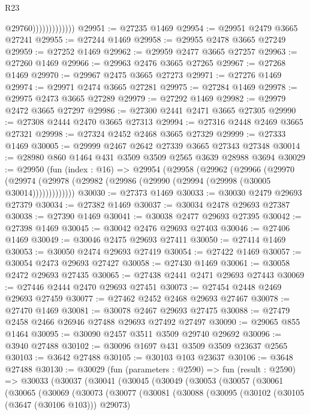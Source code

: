 \begin{lexlean}{R23}
\begin{coremodule}
                              @29760)))))))))))))
@29951 := @27235 @1469
@29954 := @29951 @2479 @3665 @27241
@29955 := @27244 @1469
@29958 := @29955 @2478 @3665 @27249
@29959 := @27252 @1469
@29962 := @29959 @2477 @3665 @27257
@29963 := @27260 @1469
@29966 := @29963 @2476 @3665 @27265
@29967 := @27268 @1469
@29970 := @29967 @2475 @3665 @27273
@29971 := @27276 @1469
@29974 := @29971 @2474 @3665 @27281
@29975 := @27284 @1469
@29978 := @29975 @2473 @3665 @27289
@29979 := @27292 @1469
@29982 := @29979 @2472 @3665 @27297
@29986 := @27300 @2441 @2471 @3665 @27305
@29990 := @27308 @2444 @2470 @3665 @27313
@29994 := @27316 @2448 @2469 @3665 @27321
@29998 := @27324 @2452 @2468 @3665 @27329
@29999 := @27333 @1469
@30005 := @29999 @2467 @2642 @27339 @3665 @27343 @27348
@30014 := @28980 @860 @1464 @431 @3509 @3509 @2565 @3639 @28988 @3694
@30029 := @29950
    (fun (index : @16) =>
    @29954
      (@29958
        (@29962
          (@29966
            (@29970
              (@29974 (@29978 (@29982 (@29986 (@29990 (@29994 (@29998 (@30005 @30014)))))))))))))
@30030 := @27373 @1469
@30033 := @30030 @2479 @29693 @27379
@30034 := @27382 @1469
@30037 := @30034 @2478 @29693 @27387
@30038 := @27390 @1469
@30041 := @30038 @2477 @29693 @27395
@30042 := @27398 @1469
@30045 := @30042 @2476 @29693 @27403
@30046 := @27406 @1469
@30049 := @30046 @2475 @29693 @27411
@30050 := @27414 @1469
@30053 := @30050 @2474 @29693 @27419
@30054 := @27422 @1469
@30057 := @30054 @2473 @29693 @27427
@30058 := @27430 @1469
@30061 := @30058 @2472 @29693 @27435
@30065 := @27438 @2441 @2471 @29693 @27443
@30069 := @27446 @2444 @2470 @29693 @27451
@30073 := @27454 @2448 @2469 @29693 @27459
@30077 := @27462 @2452 @2468 @29693 @27467
@30078 := @27470 @1469
@30081 := @30078 @2467 @29693 @27475
@30088 := @27479 @2458 @2466 @26946 @27488 @29693 @27492 @27497
@30090 := @29065 @855 @1464
@30095 := @30090 @2457 @3511 @3509 @29740 @29692
@30096 := @3940 @27488
@30102 := @30096 @1697 @431 @3509 @3509 @23637 @2565
@30103 := @3642 @27488
@30105 := @30103 @103 @23637
@30106 := @3648 @27488
@30130 := @30029
    (fun (parameters : @2590) =>
    fun (result : @2590) =>
    @30033
      (@30037
        (@30041
          (@30045
            (@30049
              (@30053
                (@30057
                  (@30061
                    (@30065
                      (@30069
                        (@30073
                          (@30077
                            (@30081
                              (@30088
                                (@30095
                                  (@30102 (@30105 (@3647 (@30106 @103))) @29073)

\end{coremodule}
\end{lexlean}
